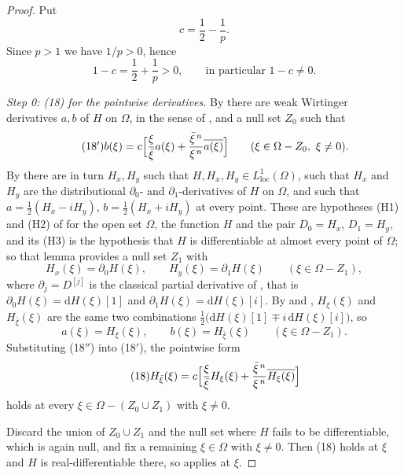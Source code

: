 \begin{proof}
Put
\[
  c=\frac12-\frac1p .
\]
Since $p>1$ we have $1/p>0$, hence
\begin{equation}\tag{0}
  1-c=\frac12+\frac1p>0,\qquad\text{in particular } 1-c\neq0 .
\end{equation}

\emph{Step 0: (18) for the pointwise derivatives.}  By 
there are weak Wirtinger derivatives $a,b$ of $H$ on $\Omega$, in the sense of
, and a null set $Z_0$ such that
\begin{equation}\tag{18$'$}
  b(\xi)=c\Bigl[\frac{\xi}{\bar\xi}a(\xi)
    +\frac{\bar\xi^{\,n}}{\xi^{\,n}}\overline{a(\xi)}\Bigr]
  \qquad(\xi\in\Omega-Z_0,\ \xi\neq0).
\end{equation}
By  there are in turn $H_x,H_y$ such that
$H,H_x,H_y\in L^1_{\mathrm{loc}}(\Omega)$, such that $H_x$ and $H_y$ are the
distributional $\partial_0$- and $\partial_1$-derivatives of $H$ on $\Omega$,
and such that $a=\tfrac12(H_x-iH_y)$, $b=\tfrac12(H_x+iH_y)$ at every point.
These are hypotheses (H1) and (H2) of  for the
open set $\Omega$, the function $H$ and the pair $D_0=H_x$, $D_1=H_y$, and its
(H3) is the hypothesis that $H$ is differentiable at almost every point of
$\Omega$; so that lemma provides a null set $Z_1$ with
\[
  H_x(\xi)=\partial_0H(\xi),\qquad H_y(\xi)=\partial_1H(\xi)
  \qquad(\xi\in\Omega-Z_1),
\]
where $\partial_j=D^{[j]}$ is the classical partial derivative of
, that is $\partial_0H(\xi)=\mathrm{d}H(\xi)[1]$ and
$\partial_1H(\xi)=\mathrm{d}H(\xi)[i]$.  By  and ,
$H_\xi(\xi)$ and $H_{\bar\xi}(\xi)$ are the same two combinations
$\tfrac12\bigl(\mathrm{d}H(\xi)[1]\mp i\,\mathrm{d}H(\xi)[i]\bigr)$, so
\begin{equation}\tag{18$''$}
  a(\xi)=H_\xi(\xi),\qquad b(\xi)=H_{\bar\xi}(\xi)\qquad(\xi\in\Omega-Z_1).
\end{equation}
Substituting (18$''$) into (18$'$), the pointwise form
\begin{equation}\tag{18}
  H_{\bar\xi}(\xi)=c\Bigl[\frac{\xi}{\bar\xi}H_\xi(\xi)
    +\frac{\bar\xi^{\,n}}{\xi^{\,n}}\overline{H_\xi(\xi)}\Bigr]
\end{equation}
holds at every $\xi\in\Omega-(Z_0\cup Z_1)$ with $\xi\neq0$.

Discard the union of $Z_0\cup Z_1$ and the null set where $H$ fails to be
differentiable, which is again null, and fix a remaining $\xi\in\Omega$ with
$\xi\neq0$.  Then (18) holds at $\xi$ and $H$ is real-differentiable there, so
 applies at $\xi$.


\end{proof}
